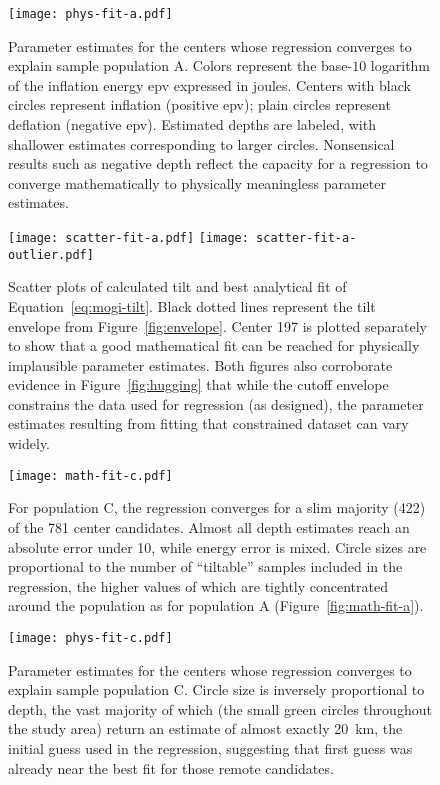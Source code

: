 \begin{figure}
    \texttt{[image: phys-fit-a.pdf]}%
    \caption[Population A: parameter estimates]{Parameter estimates for the centers whose regression converges to explain sample population A. Colors represent the base-$10$ logarithm of the inflation energy \acs{epv} expressed in joules. Centers with black circles represent inflation (positive \acs{epv}); plain circles represent deflation (negative \acs{epv}). Estimated depths are labeled, with shallower estimates corresponding to larger circles. Nonsensical results such as negative depth reflect the capacity for a regression to converge mathematically to physically meaningless parameter estimates.}%
    \label{fig:phys-fit-a}
\end{figure}

\begin{figure}
    \texttt{[image: scatter-fit-a.pdf]}
    \texttt{[image: scatter-fit-a-outlier.pdf]}
    \caption[Population A: scatter Plots \& analytical fit]{Scatter plots of calculated tilt and best analytical fit of Equation~\eqref{eq:mogi-tilt}. Black dotted lines represent the tilt envelope from Figure~\ref{fig:envelope}. Center 197 is plotted separately to show that a good mathematical fit can be reached for physically implausible parameter estimates. Both figures also corroborate evidence in Figure~\ref{fig:hugging} that while the cutoff envelope constrains the data used for regression (as designed), the parameter estimates resulting from fitting that constrained dataset can vary widely.}%
    \label{fig:scatter-fit-a}
\end{figure}

\begin{figure}
    \texttt{[image: math-fit-c.pdf]}
    \caption[Population C: goodness of fit]{For population C, the regression converges for a slim majority (422) of the 781 center candidates. Almost all depth estimates reach an absolute error under 10, while energy error is mixed. Circle sizes are proportional to the number of ``tiltable'' samples included in the regression, the higher values of which are tightly concentrated around the population as for population A (Figure~\ref{fig:math-fit-a}).}%
    \label{fig:math-fit-c}
\end{figure}

\begin{figure}
    \texttt{[image: phys-fit-c.pdf]}%
    \caption[Population C: parameter estimates]{Parameter estimates for the centers whose regression converges to explain sample population C. Circle size is inversely proportional to depth, the vast majority of which (the small green circles throughout the study area) return an estimate of almost exactly \qty{20}{\km}, the initial guess used in the regression, suggesting that first guess was already near the best fit for those remote candidates.}%
    \label{fig:phys-fit-c}
\end{figure}

